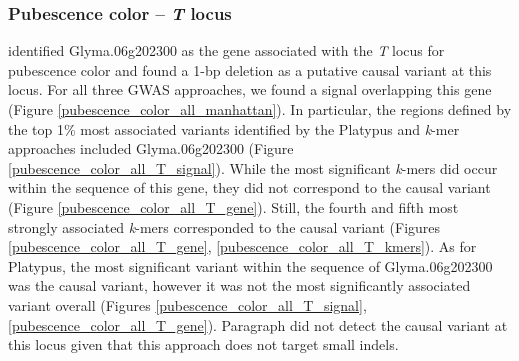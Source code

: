 \begin{figure}
\end{figure}

\subsubsection*{Pubescence color -- \textit{T} locus}
\label{sv-gwas-main-results-pubescence-color-t}

\cite{zabala2003} identified Glyma.06g202300 as the gene associated with the
\textit{T} locus for pubescence color and found a 1-bp deletion as
a putative causal variant at this locus. For all three GWAS approaches, we
found a signal overlapping this gene (Figure
\ref{pubescence_color_all_manhattan}). In
particular, the regions defined by the top 1\% most associated variants identified by the
Platypus and \textit{k}-mer approaches included Glyma.06g202300 (Figure
\ref{pubescence_color_all_T_signal}). While the most significant
\textit{k}-mers did occur within the sequence of this gene, they did not
correspond to the causal variant (Figure \ref{pubescence_color_all_T_gene}).
Still, the fourth and fifth most strongly associated \textit{k}-mers
corresponded to the causal variant (Figures \ref{pubescence_color_all_T_gene},
\ref{pubescence_color_all_T_kmers}). As for Platypus, the most significant
variant within the sequence of Glyma.06g202300 was the causal
variant, however it was not the most significantly associated variant overall
(Figures \ref{pubescence_color_all_T_signal},
\ref{pubescence_color_all_T_gene}). Paragraph did not detect the causal
variant at this locus given that this approach does not target small indels.

